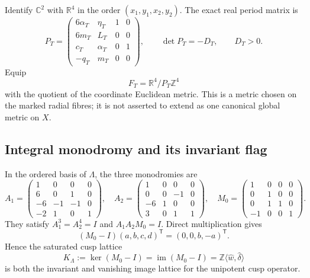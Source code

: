 \documentclass[11pt,letterpaper]{article}
\numberwithin{equation}{section}
\theoremstyle{definition}
\theoremstyle{remark}
\newcommand{\R}{\mathbb R}
\newcommand{\C}{\mathbb C}
\newcommand{\Z}{\mathbb Z}
\newcommand{\im}{\operatorname{im}}
\begin{document}
Identify $\C^2$ with $\R^4$ in the order
$(x_1,y_1,x_2,y_2)$.  The exact real period matrix is
\begin{equation}
 P_T=
 \begin{pmatrix}
 6\alpha_T&\eta_T&1&0\\
 6m_T&L_T&0&0\\
 c_T&\alpha_T&0&1\\
 -q_T&m_T&0&0
 \end{pmatrix},
 \qquad \det P_T=-D_T,\qquad D_T>0.
 \label{eq:real-period-matrix}
\end{equation}
Equip
\begin{equation}
 F_T=\R^4/P_T\Z^4
 \label{eq:radial-fibre}
\end{equation}
with the quotient of the coordinate Euclidean metric.  This is a metric
chosen on the marked radial fibres; it is not asserted to extend as one
canonical global metric on $X$.

\subsection{Integral monodromy and its invariant flag}

In the ordered basis of $\Lambda$, the three monodromies are
\begin{equation}
 A_1=
 \begin{pmatrix}
 1&0&0&0\\6&0&1&0\\-6&-1&-1&0\\-2&1&0&1
 \end{pmatrix},\quad
 A_2=
 \begin{pmatrix}
 1&0&0&0\\0&0&-1&0\\-6&1&0&0\\3&0&1&1
 \end{pmatrix},\quad
 M_0=
 \begin{pmatrix}
 1&0&0&0\\0&1&0&0\\0&1&1&0\\-1&0&0&1
 \end{pmatrix}.
 \label{eq:monodromy-matrices}
\end{equation}
They satisfy $A_1^3=A_2^4=I$ and $A_1A_2M_0=I$.  Direct multiplication
gives
\begin{equation}
 (M_0-I)(a,b,c,d)^{\mathsf T}=(0,0,b,-a)^{\mathsf T}.
 \label{eq:cusp-monodromy-action}
\end{equation}
Hence the saturated cusp lattice
\begin{equation}
 K_\Lambda:=\ker(M_0-I)=\im(M_0-I)
 =\Z\langle\widehat w,\widehat\delta\rangle
 \label{eq:cusp-lattice}
\end{equation}
is both the invariant and vanishing image lattice for the unipotent cusp
operator.
\end{document}

